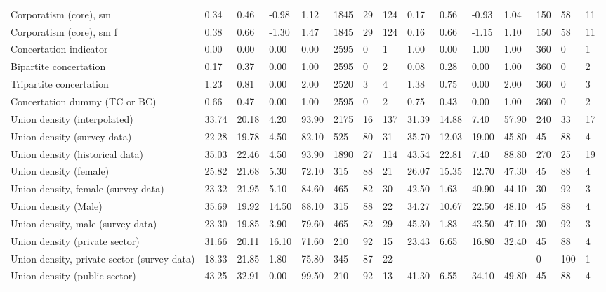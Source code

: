 \begin{longtable}{lllllllllllllll}
\addlinespace
Corporatism (core), sm & 0.34 & 0.46 & -0.98 & 1.12 & 1845 & 29 & 124 & 0.17 & 0.56 & -0.93 & 1.04 & 150 & 58 & 11\\
Corporatism (core), sm f & 0.38 & 0.66 & -1.30 & 1.47 & 1845 & 29 & 124 & 0.16 & 0.66 & -1.15 & 1.10 & 150 & 58 & 11\\
Concertation indicator & 0.00 & 0.00 & 0.00 & 0.00 & 2595 & 0 & 1 & 1.00 & 0.00 & 1.00 & 1.00 & 360 & 0 & 1\\
Bipartite concertation & 0.17 & 0.37 & 0.00 & 1.00 & 2595 & 0 & 2 & 0.08 & 0.28 & 0.00 & 1.00 & 360 & 0 & 2\\
Tripartite concertation & 1.23 & 0.81 & 0.00 & 2.00 & 2520 & 3 & 4 & 1.38 & 0.75 & 0.00 & 2.00 & 360 & 0 & 3\\
\addlinespace
Concertation dummy (TC or BC) & 0.66 & 0.47 & 0.00 & 1.00 & 2595 & 0 & 2 & 0.75 & 0.43 & 0.00 & 1.00 & 360 & 0 & 2\\
Union density (interpolated) & 33.74 & 20.18 & 4.20 & 93.90 & 2175 & 16 & 137 & 31.39 & 14.88 & 7.40 & 57.90 & 240 & 33 & 17\\
Union density (survey data) & 22.28 & 19.78 & 4.50 & 82.10 & 525 & 80 & 31 & 35.70 & 12.03 & 19.00 & 45.80 & 45 & 88 & 4\\
Union density (historical data) & 35.03 & 22.46 & 4.50 & 93.90 & 1890 & 27 & 114 & 43.54 & 22.81 & 7.40 & 88.80 & 270 & 25 & 19\\
Union density (female) & 25.82 & 21.68 & 5.30 & 72.10 & 315 & 88 & 21 & 26.07 & 15.35 & 12.70 & 47.30 & 45 & 88 & 4\\
\addlinespace
Union density, female (survey data) & 23.32 & 21.95 & 5.10 & 84.60 & 465 & 82 & 30 & 42.50 & 1.63 & 40.90 & 44.10 & 30 & 92 & 3\\
Union density (Male) & 35.69 & 19.92 & 14.50 & 88.10 & 315 & 88 & 22 & 34.27 & 10.67 & 22.50 & 48.10 & 45 & 88 & 4\\
Union density, male (survey data) & 23.30 & 19.85 & 3.90 & 79.60 & 465 & 82 & 29 & 45.30 & 1.83 & 43.50 & 47.10 & 30 & 92 & 3\\
Union density (private sector) & 31.66 & 20.11 & 16.10 & 71.60 & 210 & 92 & 15 & 23.43 & 6.65 & 16.80 & 32.40 & 45 & 88 & 4\\
Union density, private sector (survey data) & 18.33 & 21.85 & 1.80 & 75.80 & 345 & 87 & 22 &  &  &  &  & 0 & 100 & 1\\
\addlinespace
Union density (public sector) & 43.25 & 32.91 & 0.00 & 99.50 & 210 & 92 & 13 & 41.30 & 6.55 & 34.10 & 49.80 & 45 & 88 & 4\\

\end{longtable}
